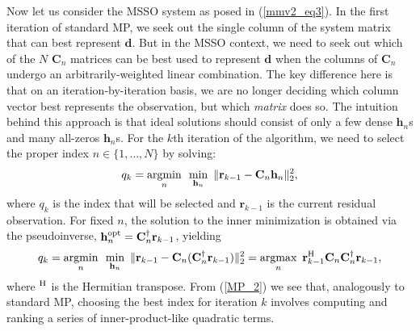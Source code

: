 \documentclass[final]{siamltex}
\newcommand{\la}[1]{\mbox{$\mathbf{#1}$}}  \newcommand{\sst}[1]{\mbox{\scriptsize{#1}}}
\begin{document}
    Now let us consider the MSSO system as posed in (\ref{mmv2_eq3}).  In
    the first iteration of standard MP, we seek out the single column
    of the system matrix that can best represent \la{d}.  But in
    the MSSO context, we need to seek out which of the $N$ $\la{C}_n$
    matrices can be best used to represent \la{d} when the columns of
    $\la{C}_n$ undergo an arbitrarily-weighted linear combination.
    The key difference here is that on an iteration-by-iteration
    basis, we are no longer deciding which column vector best
    represents the observation, but which {\em{matrix}} does so.  The
    intuition behind this approach is that ideal solutions should
    consist of only a few dense $\la{h}_n$s and many all-zeros
    $\la{h}_n$s.  For the $k$th iteration of the algorithm, we 
    need to select the proper index $n \in \{1, \ldots, N\}$ by solving:
    \begin{equation}\label{MP_1}
       q_k =
       \mathop{\mbox{argmin}}_{\mbox{\scriptsize{$n$}}} 
         \mbox{  }
       \mathop{\mbox{min}}_{\mbox{\scriptsize{$\la{h}_n$}}}   
         \mbox{  }
       \Vert \la{r}_{k-1} - \la{C}_n \la{h}_n \Vert_2^2,
    \end{equation}
    where $q_k$ is the index that will be selected and $\la{r}_{k-1}$
    is the current residual observation.  For fixed $n$, the solution
    to the inner minimization is obtained via the pseudoinverse,
    $\la{h}_n^{\sst{opt}} = \la{C}_n^{\dagger} \la{r}_{k-1}$, yielding
    \begin{equation}\label{MP_2}
       q_k =
       \mathop{\mbox{argmin}}_{\mbox{\scriptsize{$n$}}} 
         \mbox{  }
       \mathop{\mbox{min}}_{\mbox{\scriptsize{$\la{h}_n$}}}   
         \mbox{  }
       \Vert \la{r}_{k-1} - \la{C}_n ( \la{C}_n^{\dagger} \la{r}_{k-1} ) \Vert_2^2
	   =
       \mathop{\mbox{argmax}}_{\mbox{\scriptsize{$n$}}}
         \mbox{  }
	\la{r}_{k-1}^{\sst{H}} \la{C}_n \la{C}_n^{\dagger} \la{r}_{k-1},
    \end{equation}
    where $^{\sst{H}}$ is the Hermitian transpose.  From (\ref{MP_2})
    we see that, analogously to standard MP, choosing the best index
    for iteration $k$ involves computing and ranking a series of
    inner-product-like quadratic terms.
\end{document}
